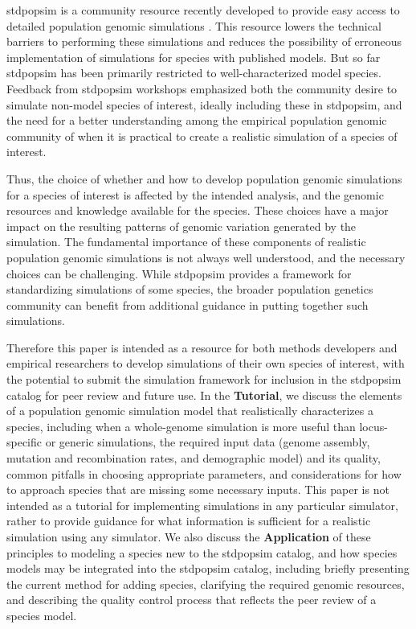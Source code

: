 \documentclass[hidelinks]{article}
\begin{document}
stdpopsim is a community resource recently developed to provide easy
access to detailed population genomic simulations \citep{Adrion2020}. This
resource lowers the technical barriers to performing these simulations
and reduces the possibility of erroneous implementation of simulations
for species with published models. But so far stdpopsim has been
primarily restricted to well-characterized model species. Feedback from
stdpopsim workshops emphasized both the community desire to simulate
non-model species of interest, ideally including these in stdpopsim, and
the need for a better understanding among the empirical population
genomic community of when it is practical to create a realistic
simulation of a species of interest.

Thus, the choice of whether and how to develop population genomic
simulations for a species of interest is affected by the intended
analysis, and the genomic resources and knowledge available for the
species. These choices have a major impact on the resulting patterns of
genomic variation generated by the simulation. The fundamental
importance of these components of realistic population genomic
simulations is not always well understood, and the necessary choices can
be challenging. While stdpopsim provides a framework for standardizing
simulations of some species, the broader population genetics community
can benefit from additional guidance in putting together such
simulations.

Therefore this paper is intended as a resource for both methods
developers and empirical researchers to develop simulations of their own
species of interest, with the potential to submit the simulation
framework for inclusion in the stdpopsim catalog for peer review and
future use. In the \textbf{Tutorial}, we discuss the elements of a
population genomic simulation model that realistically characterizes a
species, including when a whole-genome simulation is more useful than
locus-specific or generic simulations, the required input data (genome
assembly, mutation and recombination rates, and demographic model) and
its quality, common pitfalls in choosing appropriate parameters, and
considerations for how to approach species that are missing some
necessary inputs. This paper is not intended as a tutorial for
implementing simulations in any particular simulator, rather to provide
guidance for what information is sufficient for a realistic simulation
using any simulator. We also discuss the \textbf{Application} of these
principles to modeling a species new to the stdpopsim catalog, and how
species models may be integrated into the stdpopsim catalog, including
briefly presenting the current method for adding species, clarifying the
required genomic resources, and describing the quality control process
that reflects the peer review of a species model.
\end{document}
